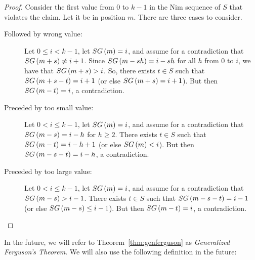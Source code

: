 \documentclass[english,12pt]{article}
\begin{document}
\begin{proof}
Consider the first value from $0$ to $k-1$ in the Nim sequence of $S$ that violates the claim.  Let it be in position $m$.  There are three cases to consider.
\begin{description}
\item[Followed by wrong value:] Let $0\leq i<k-1$, let $SG\left(m\right)=i$, and assume for a contradiction that $SG\left(m+s\right)\neq i+1$.  Since $SG\left(m-sh\right)=i-sh$ for all $h$ from $0$ to $i$, we have that $SG\left(m+s\right)>i$.  So, there exists $t\in S$ such that $SG\left(m+s-t\right)=i+1$ (or else $SG\left(m+s\right)=i+1$).  But then $SG\left(m-t\right)=i$, a contradiction.
\item[Preceded by too small value:] Let $0<i\leq k-1$, let $SG\left(m\right)=i$, and assume for a contradiction that $SG\left(m-s\right)=i-h$ for $h\geq2$.  There exists $t\in S$ such that $SG\left(m-t\right)=i-h+1$ (or else $SG\left(m\right)<i$).  But then $SG\left(m-s-t\right)=i-h$, a contradiction.
\item[Preceded by too large value:] Let $0<i\leq k-1$, let $SG\left(m\right)=i$, and assume for a contradiction that $SG\left(m-s\right)>i-1$.  There exists $t\in S$ such that $SG\left(m-s-t\right)=i-1$ (or else $SG\left(m-s\right)\leq i-1$).  But then $SG\left(m-t\right)=i$, a contradiction.
\end{description}
\end{proof}
In the future, we will refer to Theorem~\ref{thm:genferguson} as \emph{Generalized Ferguson's Theorem}.  We will also use the following definition in the future:
\end{document}
